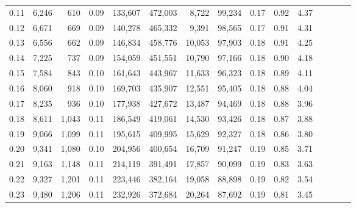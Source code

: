 \begin{tabular}{rrrcrrrrrrrrrrr}
0.11 &   6,246 &     610 &                                       0.09 &  133,607 &  472,003 &    8,722 &   99,234 &  0.17 &  0.92 &                         4.37 \\
0.12 &   6,671 &     669 &                                       0.09 &  140,278 &  465,332 &    9,391 &   98,565 &  0.17 &  0.91 &                         4.31 \\
0.13 &   6,556 &     662 &                                       0.09 &  146,834 &  458,776 &   10,053 &   97,903 &  0.18 &  0.91 &                         4.25 \\
0.14 &   7,225 &     737 &                                       0.09 &  154,059 &  451,551 &   10,790 &   97,166 &  0.18 &  0.90 &                         4.18 \\
0.15 &   7,584 &     843 &                                       0.10 &  161,643 &  443,967 &   11,633 &   96,323 &  0.18 &  0.89 &                         4.11 \\
0.16 &   8,060 &     918 &                                       0.10 &  169,703 &  435,907 &   12,551 &   95,405 &  0.18 &  0.88 &                         4.04 \\
0.17 &   8,235 &     936 &                                       0.10 &  177,938 &  427,672 &   13,487 &   94,469 &  0.18 &  0.88 &                         3.96 \\
0.18 &   8,611 &   1,043 &                                       0.11 &  186,549 &  419,061 &   14,530 &   93,426 &  0.18 &  0.87 &                         3.88 \\
0.19 &   9,066 &   1,099 &                                       0.11 &  195,615 &  409,995 &   15,629 &   92,327 &  0.18 &  0.86 &                         3.80 \\
0.20 &   9,341 &   1,080 &                                       0.10 &  204,956 &  400,654 &   16,709 &   91,247 &  0.19 &  0.85 &                         3.71 \\
0.21 &   9,163 &   1,148 &                                       0.11 &  214,119 &  391,491 &   17,857 &   90,099 &  0.19 &  0.83 &                         3.63 \\
0.22 &   9,327 &   1,201 &                                       0.11 &  223,446 &  382,164 &   19,058 &   88,898 &  0.19 &  0.82 &                         3.54 \\
0.23 &   9,480 &   1,206 &                                       0.11 &  232,926 &  372,684 &   20,264 &   87,692 &  0.19 &  0.81 &                         3.45 \\

\end{tabular}
